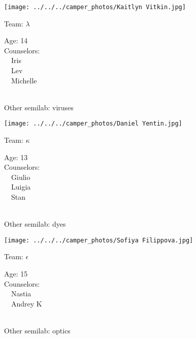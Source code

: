 \documentclass[10pt,letterpaper, landscape]{article}
\begin{document}
\horizontalshiftfornextsticker
\renewcommand{\baselinestretch}{1} \begin{sticker}
\noindent\begin{minipage}{0.5\textwidth}\texttt{[image: ../../../camper\_photos/Kaitlyn Vitkin.jpg]}\end{minipage}\begin{minipage}{0.45\textwidth}
Team: {\Large $\lambda$}

Age:        14\\
Counselors: \\\ \ Iris\\\ \ Lev\\\ \ Michelle\\
\end{minipage} \\ \vspace{0.07in}
Other semilab: viruses
\end{sticker}
\horizontalshiftfornextsticker
\renewcommand{\baselinestretch}{1} \begin{sticker}
\noindent\begin{minipage}{0.5\textwidth}\texttt{[image: ../../../camper\_photos/Daniel Yentin.jpg]}\end{minipage}\begin{minipage}{0.45\textwidth}
Team: {\Large $\kappa$}

Age:        13\\
Counselors: \\\ \ Giulio\\\ \ Luigia\\\ \ Stan\\
\end{minipage} \\ \vspace{0.07in}
Other semilab: dyes
\end{sticker}
\horizontalshiftfornextsticker
\renewcommand{\baselinestretch}{1} \begin{sticker}
\noindent\begin{minipage}{0.5\textwidth}\texttt{[image: ../../../camper\_photos/Sofiya Filippova.jpg]}\end{minipage}\begin{minipage}{0.45\textwidth}
Team: {\Large $\epsilon$}

Age:        15\\
Counselors: \\\ \ Nastia\\\ \ Andrey K\\
\end{minipage} \\ \vspace{0.07in}
Other semilab: optics
\end{sticker}
\end{document}
